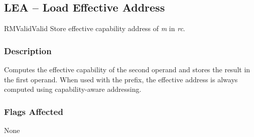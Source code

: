 \clearpage
{}
{}
\subsection*{LEA -- Load Effective Address}

\begin{x86opcodetable}
  {RM}{Valid}{Valid}
  {Store effective capability address of \emph{m} in \emph{rc}.}
\end{x86opcodetable}

\begin{x86opentable}
\end{x86opentable}

\subsubsection*{Description}

Computes the effective capability of the second operand and stores the
result in the first operand.  When used with the 
prefix, the effective address is always computed using
capability-aware addressing.

\subsubsection*{Flags Affected}

None
